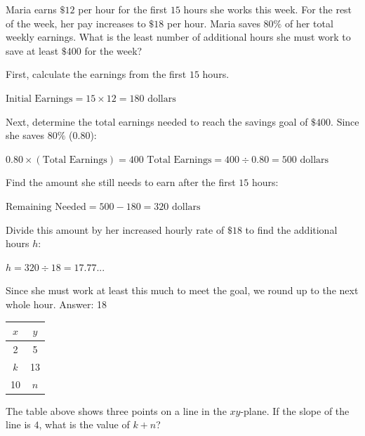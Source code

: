 \documentclass[11pt,paper=a4,answers]{exam}
\begin{document}
\begin{questions}
\vspace{1cm}

\question
Maria earns $\$12$ per hour for the first $15$ hours she works this week. For the rest of the week, her pay increases to $\$18$ per hour. Maria saves $80\%$ of her total weekly earnings. What is the least number of additional hours she must work to save at least $\$400$ for the week?

\begin{solution}
First, calculate the earnings from the first $15$ hours.
\vspace{5pt}
\begin{center}
$\text{Initial Earnings} = 15 \times 12 = 180 \text{ dollars}$
\end{center}
\vspace{5pt}
Next, determine the total earnings needed to reach the savings goal of $\$400$. Since she saves $80\%$ ($0.80$):
\vspace{5pt}
\begin{center}
$0.80 \times (\text{Total Earnings}) = 400$
\vspace{5pt}
$\text{Total Earnings} = 400 \div 0.80 = 500 \text{ dollars}$
\end{center}
\vspace{5pt}
Find the amount she still needs to earn after the first $15$ hours:
\vspace{5pt}
\begin{center}
$\text{Remaining Needed} = 500 - 180 = 320 \text{ dollars}$
\end{center}
\vspace{5pt}
Divide this amount by her increased hourly rate of $\$18$ to find the additional hours $h$:
\vspace{5pt}
\begin{center}
$h = 320 \div 18 = 17.77...$
\end{center}
\vspace{5pt}
Since she must work at least this much to meet the goal, we round up to the next whole hour.
\vspace{5pt}
Answer: \colorbox{yellow!100}{18}
\end{solution}

\vspace{1cm}

\question
\begin{center}
\begin{tabular}{|c|c|}
\hline
$x$ & $y$ \\ \hline
2 & 5 \\ \hline
$k$ & 13 \\ \hline
10 & $n$ \\ \hline
\end{tabular}
\end{center}
The table above shows three points on a line in the $xy$-plane. If the slope of the line is $4$, what is the value of $k + n$?


\end{questions}
\end{document}
